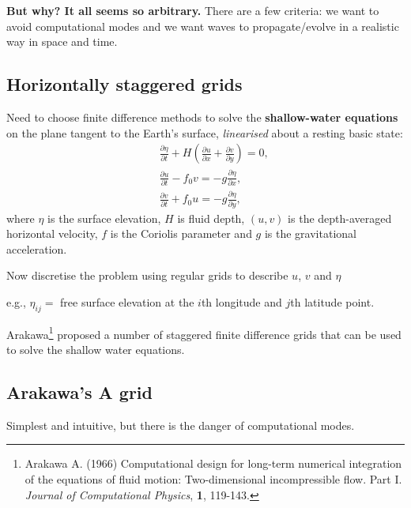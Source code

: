 {\bf But why? It all seems so arbitrary.} There are a few criteria: we want to avoid computational modes and we want waves to propagate/evolve in a realistic way in space and time.
\subsection{Horizontally staggered grids} 

Need to choose finite difference
methods to solve the {\bf shallow-water equations} on the
plane tangent to the Earth's surface, {\em linearised} about a resting basic state:
\begin{eqnarray}
	&&\frac{\partial \eta}{\partial t} + H \left(
	\frac{\partial u}{\partial x}+\frac{\partial v}{\partial y}\right) = 0,
	\\
	&&\frac{\partial u}{\partial t} - f_0 v = - g\frac{\partial \eta}{\partial x}, \\
	&&\frac{\partial v}{\partial t} + f_0 u = - g\frac{\partial \eta}{\partial y}, 
\end{eqnarray}
where $\eta$ is the surface elevation, $H$ is fluid depth, $(u,v)$ is
the depth-averaged horizontal velocity, $f$ is the Coriolis parameter
and $g$ is the gravitational acceleration. 

Now discretise the problem using regular grids to describe $u$, $v$ and $\eta$ 

e.g., $\eta_{ij}=$ free surface elevation at the $i$th longitude and $j$th
latitude point.


Arakawa\footnote{Arakawa
	A. (1966) Computational design for long-term numerical integration of
	the equations of fluid motion: Two-dimensional incompressible
	flow. Part I. \emph{Journal of Computational Physics}, \textbf{1},
	119-143.} proposed a number of staggered finite difference
grids that can be used to solve the shallow water equations.  


\subsection{Arakawa's A grid}
Simplest and intuitive, but there is the danger of computational modes.\\

